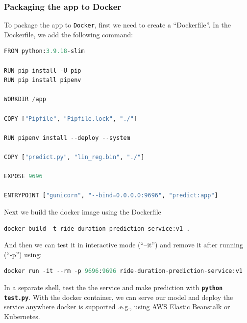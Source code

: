 \documentclass[letterpaper,12pt,notitlepage,twoside]{report}
\begin{document}
\subsubsection{Packaging the app to Docker}
To package the app to \texttt{Docker}, first we need to create a ``Dockerfile''. In the Dockerfile, we add the following command:
\begin{lstlisting}[language=python, numbers=none]
FROM python:3.9.18-slim

RUN pip install -U pip
RUN pip install pipenv

WORKDIR /app  

COPY ["Pipfile", "Pipfile.lock", "./"]

RUN pipenv install --deploy --system

COPY ["predict.py", "lin_reg.bin", "./"]

EXPOSE 9696

ENTRYPOINT ["gunicorn", "--bind=0.0.0.0:9696", "predict:app"]
\end{lstlisting}

Next we build the docker image using the Dockerfile
\begin{lstlisting}[language=python, numbers=none]
docker build -t ride-duration-prediction-service:v1 .
\end{lstlisting}

And then we can test it in interactive mode (``--it'') and remove it after running (``-p'') using:
\begin{lstlisting}[language=python, numbers=none]
docker run -it --rm -p 9696:9696 ride-duration-prediction-service:v1 
\end{lstlisting}

In a separate shell, test the the service and make prediction with \textbf{\texttt{python test.py}}. With the docker container, we can serve our model and deploy the service anywhere docker is supported .e.g., using AWS Elastic Beanstalk or Kubernetes.
\end{document}
